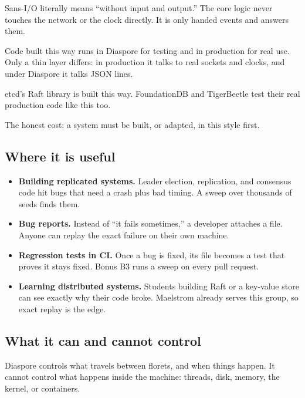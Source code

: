 \documentclass[11pt,letterpaper]{article}
\newcommand{\code}[1]{\texttt{\detokenize{#1}}}
\begin{document}
Sans-I/O literally means ``without input and output.'' The core logic never touches the network or the clock directly. It is only handed events and answers them.

Code built this way runs in Diaspore for testing and in production for real use. Only a thin layer differs: in production it talks to real sockets and clocks, and under Diaspore it talks JSON lines.

etcd's Raft library is built this way. FoundationDB and TigerBeetle test their real production code like this too.

The honest cost: a system must be built, or adapted, in this style first.

\subsection{Where it is useful}

\begin{itemize}
  \item \textbf{Building replicated systems.} Leader election, replication, and consensus code hit bugs that need a crash plus bad timing. A sweep over thousands of seeds finds them.
  \item \textbf{Bug reports.} Instead of ``it fails sometimes,'' a developer attaches a \code{.pappus} file. Anyone can replay the exact failure on their own machine.
  \item \textbf{Regression tests in CI.} Once a bug is fixed, its \code{.pappus} file becomes a test that proves it stays fixed. Bonus B3 runs a sweep on every pull request.
  \item \textbf{Learning distributed systems.} Students building Raft or a key-value store can see exactly why their code broke. Maelstrom already serves this group, so exact replay is the edge.
\end{itemize}

\subsection{What it can and cannot control}

Diaspore controls what travels between florets, and when things happen. It cannot control what happens inside the machine: threads, disk, memory, the kernel, or containers.
\end{document}
